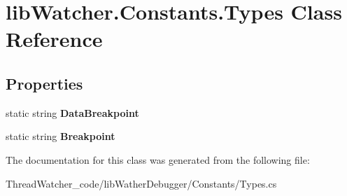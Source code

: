 \hypertarget{classlib_watcher_1_1_constants_1_1_types}{\section{lib\+Watcher.\+Constants.\+Types Class Reference}
\label{classlib_watcher_1_1_constants_1_1_types}
}
\subsection*{Properties}
\begin{DoxyCompactItemize}
\item 
\hypertarget{classlib_watcher_1_1_constants_1_1_types_a73493c5b1ae712401b43444962115566}{static string {\bfseries Data\+Breakpoint}}\label{classlib_watcher_1_1_constants_1_1_types_a73493c5b1ae712401b43444962115566}

\item 
\hypertarget{classlib_watcher_1_1_constants_1_1_types_a804ced6e730781dad2f1babe5fdb5e16}{static string {\bfseries Breakpoint}}\label{classlib_watcher_1_1_constants_1_1_types_a804ced6e730781dad2f1babe5fdb5e16}

\end{DoxyCompactItemize}


The documentation for this class was generated from the following file\+:\begin{DoxyCompactItemize}
\item 
Thread\+Watcher\+\_\+code/lib\+Wather\+Debugger/\+Constants/Types.\+cs\end{DoxyCompactItemize}
